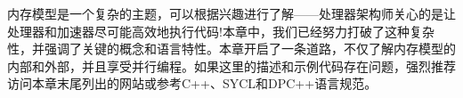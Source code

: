 内存模型是一个复杂的主题，可以根据兴趣进行了解——处理器架构师关心的是让处理器和加速器尽可能高效地执行代码!本章中，我们已经努力打破了这种复杂性，并强调了关键的概念和语言特性。本章开启了一条道路，不仅了解内存模型的内部和外部，并且享受并行编程。如果这里的描述和示例代码存在问题，强烈推荐访问本章末尾列出的网站或参考C++、SYCL和DPC++语言规范。\par














































